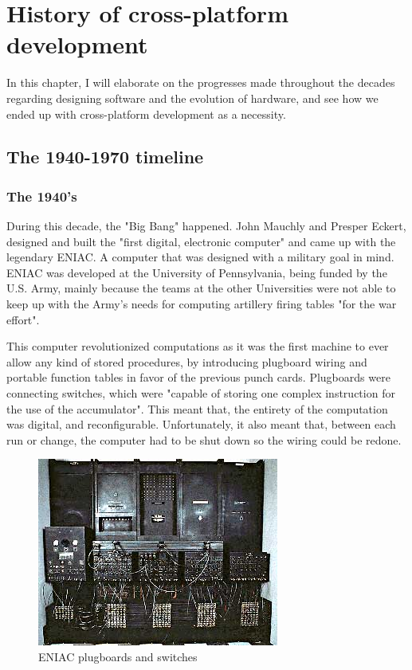 \chapter{History of cross-platform development}
\label{chap:ch1}

\indent

\par
In this chapter, I will elaborate on the progresses made throughout the decades regarding designing software and the evolution of hardware, and see how we ended up with cross-platform development as a necessity.

\section{The 1940-1970 timeline}

\subsection{The 1940's}

\par
During this decade, the "Big Bang" happened.
John Mauchly and Presper Eckert, designed and built the "first digital, electronic computer"\cite{eniacHistory} and came up with the legendary ENIAC.
A computer that was designed with a military goal in mind.
ENIAC was developed at the University of Pennsylvania, being funded by the U.S.
Army, mainly because the teams at the other Universities were not able to keep up with the Army's needs for computing artillery firing tables "for the war 
effort".\cite{eniacDesign}

\par
This computer revolutionized computations as it was the first machine to ever allow any kind of stored procedures, by introducing plugboard wiring and portable function tables in favor of the previous punch cards.
Plugboards were connecting switches, which were "capable of storing one complex instruction for the use of the accumulator".\cite{eniacSwitches}
This meant that, the entirety of the computation was digital, and reconfigurable.
Unfortunately, it also meant that, between each run or change, the computer had to be shut down so the wiring could be redone.
\begin{figure}[htbp]
    \centering
    \includegraphics[scale=0.5]{pictures/ENIAC_plugboard_switches.jpg}
    \caption{ENIAC plugboards and switches}
    \label{eniacPlugboardSwitches}
\end{figure}

